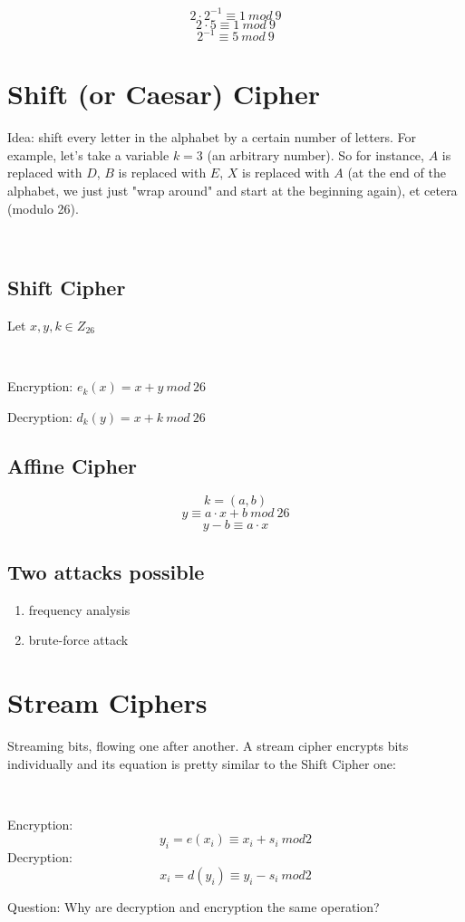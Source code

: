 \documentclass[a4paper]{article}
\begin{document}
$$2\cdot 2^{-1} \equiv 1 \ mod \ 9$$
$$2\cdot 5 \equiv 1 \ mod \ 9$$
$$2^{-1} \equiv 5 \ mod \ 9$$

\section{Shift (or Caesar) Cipher}
Idea: shift every letter in the alphabet by a certain number of letters. For example, let's take a variable $k = 3$ (an arbitrary number). So for instance, $A$ is replaced with $D$, $B$ is replaced with $E$, $X$ is replaced with $A$ (at the end of the alphabet, we just just "wrap around" and start at the beginning again), et cetera (modulo 26).

\
\subsection{Shift Cipher}
Let $x,y,k \in Z_26$

\

Encryption: $e_k(x) = x+y \ mod \ 26$

Decryption: $d_k(y) = x+k \ mod \ 26$



\subsection{Affine Cipher}
$$k=(a,b)$$
$$y \equiv a \cdot x +b \ mod \ 26$$
$$y-b \equiv a \cdot x$$

\subsection{Two attacks possible}
\begin{enumerate}
\item {frequency analysis}
\item {brute-force attack}
\end{enumerate}

\section{Stream Ciphers}
Streaming bits, flowing one after another. A stream cipher encrypts bits individually and its equation is pretty similar to the Shift Cipher one:

\

Encryption: $$y_i = e(x_i) \equiv x_i +s_i \ mod 2$$
Decryption: $$x_i = d(y_i) \equiv y_i -s_i \ mod 2$$

Question: Why are decryption and encryption the same operation?
\end{document}
